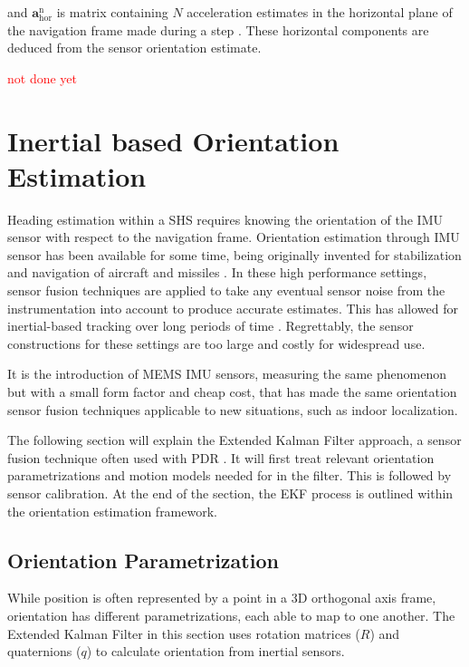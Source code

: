 and $ \mathbf{a}^\mathrm{n}_\mathrm{hor} $ is matrix containing $ N $ acceleration estimates in the horizontal plane of the navigation frame made during a step \cite{Combettes2015}. These horizontal components are deduced from the sensor orientation estimate. \par 
\textcolor{red}{not done yet}
\newpage 

\section{Inertial based Orientation Estimation}
\label{sec:rw-orientation_estimation}
Heading estimation within a \acl{SHS} requires knowing the orientation of the \ac{IMU} sensor with respect to the navigation frame. Orientation estimation through \ac{IMU} sensor has been available for some time, being originally invented for stabilization and navigation of aircraft and missiles \cite{titterton2004strapdown}. In these high performance settings, sensor fusion techniques are applied to take any eventual sensor noise from the instrumentation into account to produce accurate estimates. This has allowed for inertial-based tracking over long periods of time \cite{Harle2013}. Regrettably, the sensor constructions for these settings are too large and costly for widespread use.\par  
It is the introduction of \ac{MEMS} \ac{IMU} sensors, measuring the same phenomenon but with a small form factor and cheap cost, that has made the same orientation sensor fusion techniques applicable to new situations, such as indoor localization. \par 
The following section will explain the Extended Kalman Filter approach, a sensor fusion technique often used with PDR \cite{Michel2015a,Michel2018, Diaz2014}. It will first treat relevant orientation parametrizations and motion models needed for in the filter. This is followed by sensor calibration. At the end of the section, the EKF process is outlined within the orientation estimation framework.


\subsection{Orientation Parametrization}
While position is often represented by a point in a 3D orthogonal axis frame, orientation has different parametrizations, each able to map to one another. The Extended Kalman Filter in this section uses rotation matrices ($R$) and quaternions ($q$) to calculate orientation from inertial sensors.

